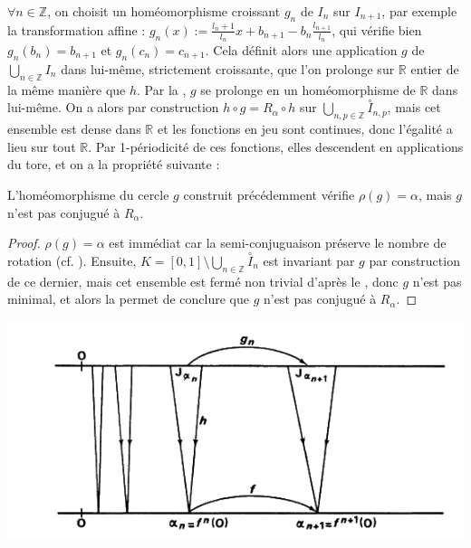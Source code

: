 \documentclass[11pt,a4paper]{article}
\begin{document}
$\forall n \in \mathbb{Z}$, on choisit un homéomorphisme croissant $g_n$ de $I_n$ sur $I_{n+1}$, par exemple la transformation affine : $g_n(x) := \displaystyle \frac{l_n+1}{l_n}x + b_{n+1}-b_n\frac{l_{n+1}}{l_n}$, qui vérifie bien $g_n(b_n)=b_{n+1}$ et $g_n(c_n)=c_{n+1}$. Cela définit alors une application $g$ de $\displaystyle \bigcup_{n\in \mathbb{Z}} I_n$ dans lui-même, strictement croissante, que l'on prolonge sur $\mathbb{R}$ entier de la même manière que $h$. Par la , $g$ se prolonge en un homéomorphisme de $\mathbb{R}$ dans lui-même. On a alors par construction $h \circ g = R_\alpha \circ h$ sur $\displaystyle \bigcup_{n,p \in \mathbb{Z}} \overset{\circ}I_{n,p}$, mais cet ensemble est dense dans $\mathbb{R}$ et les fonctions en jeu sont continues, donc l'égalité a lieu sur tout $\mathbb{R}$. Par 1-périodicité de ces fonctions, elles descendent en applications du tore, et on a la propriété suivante :

\begin{thm}\label{cont}
L'homéomorphisme du cercle $g$ construit précédemment vérifie $\rho(g)=\alpha$, mais $g$ n'est pas conjugué à $R_\alpha$.
\end{thm}

\begin{proof}
$\rho(g)=\alpha$ est immédiat car la semi-conjuguaison préserve le nombre de rotation (cf. \cite{dgv}).
Ensuite, $K = [0,1] \setminus \bigcup_{n \in \mathbb{Z}} \overset{\circ}I_{n}$ est invariant par $g$ par construction de ce dernier, mais cet ensemble est fermé non trivial d'après le  , donc $g$ n'est pas minimal, et alors la  permet de conclure que $g$ n'est pas conjugué à $R_\alpha$. 
\end{proof}

\begin{centering}
\includegraphics[scale=0.452]{diagram.png}
\end{centering}
\end{document}
